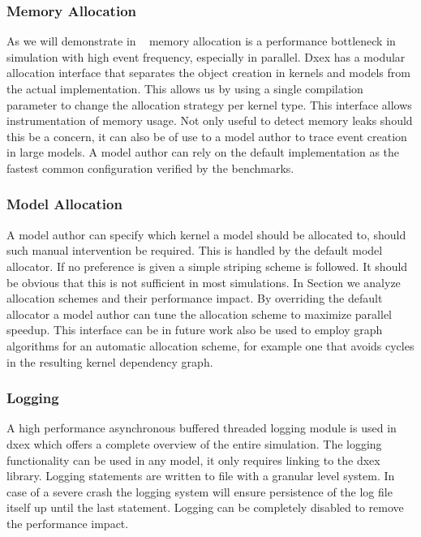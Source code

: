 \subsubsection{Memory Allocation}
As we will demonstrate in ~ memory allocation is a performance bottleneck in simulation with high event frequency, especially in parallel. Dxex has a modular allocation interface that separates the object creation in kernels and models from the actual implementation. This allows us by using a single compilation parameter to change the allocation strategy per kernel type. This interface allows instrumentation of memory usage. Not only useful to detect memory leaks should this be a concern, it can also be of use to a model author to trace event creation in large models. A model author can rely on the default implementation as the fastest common configuration verified by the benchmarks.
\subsubsection{Model Allocation}
A model author can specify which kernel a model should be allocated to, should such manual intervention be required. This is handled by the default model allocator. If no preference is given a simple striping scheme is followed. It should be obvious that this is not sufficient in most simulations. In Section  we analyze allocation schemes and their performance impact. By overriding the default allocator a model author can tune the allocation scheme to maximize parallel speedup. This interface can be in future work also be used to employ graph algorithms for an automatic allocation scheme, for example one that avoids cycles in the resulting kernel dependency graph.
\subsubsection{Logging}
A high performance asynchronous buffered threaded logging module is used in dxex which offers a complete overview of the entire simulation. The logging functionality can be used in any model, it only requires linking to the dxex library. Logging statements are written to file with a granular level system. In case of a severe crash the logging system will ensure persistence of the log file itself up until the last statement. Logging can be completely disabled to remove the performance impact.
